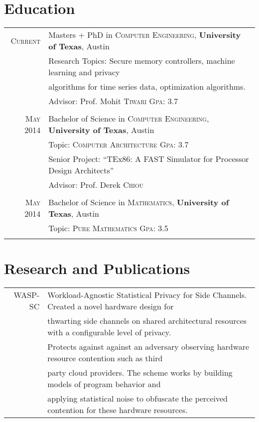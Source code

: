 \documentclass[a4paper,10pt, margin=2in]{article}
\begin{document}
\section{Education}
\begin{tabular}{rl}
 \textsc{Current} & Masters + PhD in \textsc{Computer Engineering}, \textbf{University of Texas}, Austin\\
& Research Topics: Secure memory controllers, machine learning and privacy\\
& algorithms for time series data, optimization algorithms.\\
& {\small Advisor: Prof. Mohit \textsc{Tiwari}} \hfill {\normalsize \textsc{Gpa}: 3.7~~~~~}\\\\
 \textsc{May} 2014 & Bachelor of Science in \textsc{Computer Engineering}, \textbf{University of Texas}, Austin\\
& Topic: \textsc{Computer Architecture} {\hfill \normalsize \textsc{Gpa}: 3.7~~~~} \\
& Senior Project: ``TEx86: A FAST Simulator for Processor Design Architects'' \\
& {\small Advisor: Prof. Derek \textsc{Chiou}}\\\\
 \textsc{May} 2014 & Bachelor of Science in \textsc{Mathematics}, \textbf{University of Texas}, Austin\\
& Topic: \textsc{Pure Mathematics} {\hfill \normalsize \textsc{Gpa}: 3.5~~~~}\\\\
\end{tabular}

\section{Research and Publications}
\begin{tabular}{rl}
\textsc{WASP-SC} &  \footnotesize{Workload-Agnostic Statistical Privacy for Side
Channels. Created a novel hardware design for} \\
& \footnotesize{thwarting side channels on shared architectural resources with a
configurable level of privacy.}\\
& \footnotesize{Protects against against an adversary observing
hardware resource contention such as third\em}\\
& \footnotesize{party cloud providers. The scheme works by building models of
program behavior and}\\
& \footnotesize{applying statistical noise to obfuscate the perceived contention
for these hardware resources.}

\end{tabular}
\end{document}
